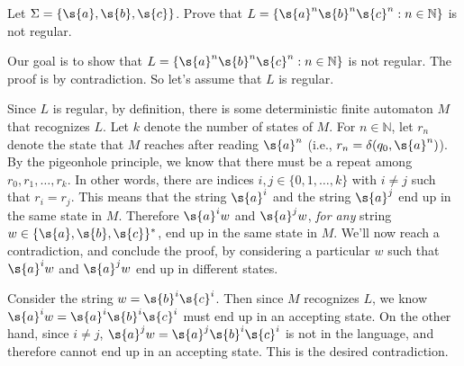 \begin{flex}
\label{grp:exercise:anbncn-is-not-regular}

\begin{exercise}
\label{exercise:anbncn-is-not-regular} 
Let $\Sigma = \{\s{a},\s{b},\s{c}\}$. Prove that $L = \{\s{a}^n\s{b}^n\s{c}^n: n \in \mathbb{N}\}$ is not regular.

\end{exercise}

\begin{solution}
\label{sol:deterministic-finite-automata::goal}
Our goal is to show that $L = \{\s{a}^n\s{b}^n\s{c}^n: n \in \mathbb{N}\}$ is not regular. The proof is by contradiction. So let's assume that $L$ is regular. 

Since $L$ is regular, by definition, there is some deterministic finite automaton $M$ that recognizes $L$. Let $k$ denote the number of states of $M$. For $n \in \mathbb{N}$, let $r_n$ denote the state that $M$ reaches after reading $\s{a}^n$ (i.e., $r_n = \delta(q_0, \s{a}^n)$). By the pigeonhole principle, we know that there must be a repeat among $r_0, r_1,\ldots, r_k$. In other words, there are indices $i, j \in \{0,1,\ldots,k\}$ with $i \neq j$ such that $r_i = r_j$. This means that the string $\s{a}^i$ and the string $\s{a}^j$ end up in the same state in $M$. Therefore $\s{a}^iw$ and $\s{a}^jw$, \emph{for any} string $w \in \{\s{a},\s{b},\s{c}\}^*$, end up in the same state in $M$. We'll now reach a contradiction, and conclude the proof, by considering a particular $w$ such that $\s{a}^iw$ and $\s{a}^jw$ end up in different states. 

Consider the string $w = \s{b}^i\s{c}^i$. Then since $M$ recognizes $L$, we know $\s{a}^iw = \s{a}^i\s{b}^i\s{c}^i$ must end up in an accepting state. On the other hand, since $i \neq j$, $\s{a}^jw = \s{a}^j\s{b}^i\s{c}^i$ is not in the language, and therefore cannot end up in an accepting state. This is the desired contradiction.

\end{solution}
\end{flex}

